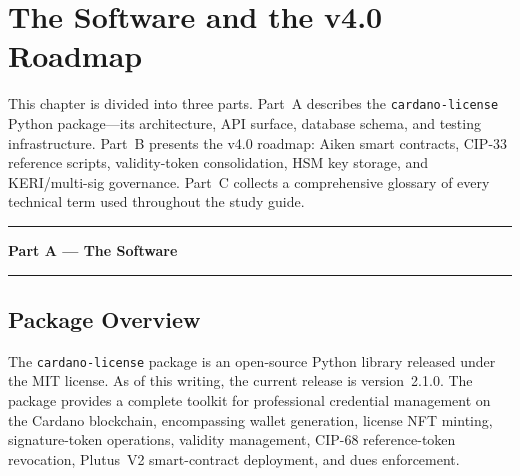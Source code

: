 
\chapter{The Software and the v4.0 Roadmap}
\label{ch:software-roadmap}

This chapter is divided into three parts.  Part~A describes the
\texttt{cardano-license} Python package---its architecture, API surface,
database schema, and testing infrastructure.  Part~B presents the v4.0
roadmap: Aiken smart contracts, CIP-33 reference scripts, validity-token
consolidation, HSM key storage, and KERI/multi-sig governance.  Part~C
collects a comprehensive glossary of every technical term used throughout the
study guide.




\vspace{0.5em}
\noindent\rule{\textwidth}{0.8pt}
\begin{center}
  {\Large\sffamily\bfseries Part A --- The Software}
\end{center}
\noindent\rule{\textwidth}{0.4pt}
\vspace{0.5em}


\section{Package Overview}
\label{sec:pkg-overview}

The \texttt{cardano-license} package is an open-source Python library
released under the MIT license.  As of this writing, the current release is
version~2.1.0.  The package provides a complete toolkit for professional
credential management on the Cardano blockchain, encompassing wallet
generation, license NFT minting, signature-token operations, validity
management, CIP-68 reference-token revocation, Plutus~V2 smart-contract
deployment, and dues enforcement.

